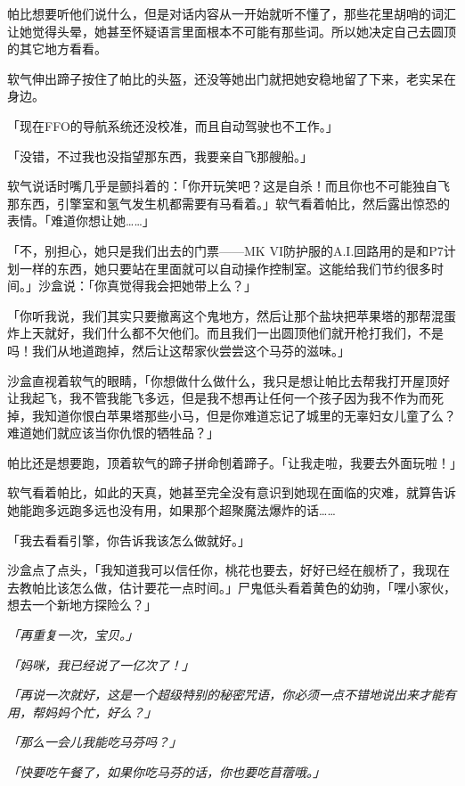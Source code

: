 帕比想要听他们说什么，但是对话内容从一开始就听不懂了，那些花里胡哨的词汇让她觉得头晕，她甚至怀疑语言里面根本不可能有那些词。所以她决定自己去圆顶的其它地方看看。

软气伸出蹄子按住了帕比的头盔，还没等她出门就把她安稳地留了下来，老实呆在身边。

「现在FFO的导航系统还没校准，而且自动驾驶也不工作。」

「没错，不过我也没指望那东西，我要亲自飞那艘船。」

软气说话时嘴几乎是颤抖着的：「你开玩笑吧？这是自杀！而且你也不可能独自飞那东西，引擎室和氢气发生机都需要有马看着。」软气看着帕比，然后露出惊恐的表情。「难道你想让她……」

「不，别担心，她只是我们出去的门票——MK VI防护服的A.I.回路用的是和P7计划一样的东西，她只要站在里面就可以自动操作控制室。这能给我们节约很多时间。」沙盒说：「你真觉得我会把她带上么？」

「你听我说，我们其实只要撤离这个鬼地方，然后让那个盐块把苹果塔的那帮混蛋炸上天就好，我们什么都不欠他们。而且我们一出圆顶他们就开枪打我们，不是吗！我们从地道跑掉，然后让这帮家伙尝尝这个马芬的滋味。」

沙盒直视着软气的眼睛，「你想做什么做什么，我只是想让帕比去帮我打开屋顶好让我起飞，我不管我能飞多远，但是我不想再让任何一个孩子因为我不作为而死掉，我知道你恨白苹果塔那些小马，但是你难道忘记了城里的无辜妇女儿童了么？难道她们就应该当你仇恨的牺牲品？」

帕比还是想要跑，顶着软气的蹄子拼命刨着蹄子。「让我走啦，我要去外面玩啦！」

软气看着帕比，如此的天真，她甚至完全没有意识到她现在面临的灾难，就算告诉她能跑多远跑多远也没有用，如果那个超聚魔法爆炸的话……

「我去看看引擎，你告诉我该怎么做就好。」

沙盒点了点头，「我知道我可以信任你，桃花也要去，好好已经在舰桥了，我现在去教帕比该怎么做，估计要花一点时间。」尸鬼低头看着黄色的幼驹，「嘿小家伙，想去一个新地方探险么？」

\horizonline


\emph{「再重复一次，宝贝。」}

\emph{「妈咪，我已经说了一亿次了！」}

\emph{「再说一次就好，这是一个超级特别的秘密咒语，你必须一点不错地说出来才能有用，帮妈妈个忙，好么？」}

\emph{「那么一会儿我能吃马芬吗？」}

\emph{「快要吃午餐了，如果你吃马芬的话，你也要吃苜蓿哦。」}


